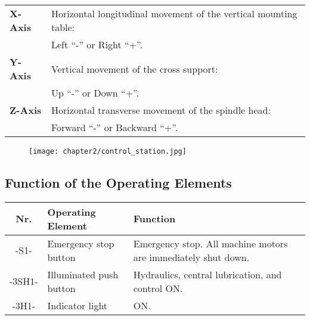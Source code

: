 \begin{tabular}{ l l }
\textbf{X-Axis} & Horizontal longitudinal movement of the vertical mounting table: \\
                & Left \enquote{-} or Right \enquote{+}. \\
\textbf{Y-Axis} & Vertical movement of the cross support: \\
                & Up \enquote{-} or Down \enquote{+}. \\
\textbf{Z-Axis} & Horizontal transverse movement of the spindle head: \\
                & Forward \enquote{-} or Backward \enquote{+}. \\
\end{tabular}


\begin{figure}[h]
    \centering
    \texttt{[image: chapter2/control\_station.jpg]} %
\end{figure}

\newpage

\subsection{Function of the Operating Elements}

\begin{tabular}{|c|l|p{10cm}|}
    \hline\hline
    \textbf{Nr.} & \textbf{Operating Element} & \textbf{Function} \\
    \hline\hline
    -S1-   & Emergency stop button & Emergency stop. All machine motors are immediately shut down.\footnotemark[11] \\
    \hline
    -3SH1- & Illuminated push button & Hydraulics, central lubrication, and control ON. \\
    -3H1-  & Indicator light & ON. \\
    \hline\hline
\end{tabular}

\vspace{0.5cm}


\newpage

\setcounter{page}{5}

